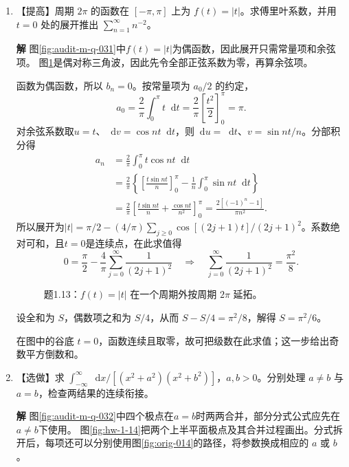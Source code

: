 \documentclass[11pt,openany,fontset=fandol]{ctexbook}
\theoremstyle{plain}\newtheorem{theorem}{定理}[chapter]\newtheorem{proposition}[theorem]{命题}
\theoremstyle{definition}\newtheorem{definition}{定义}[chapter]\newtheorem{example}{例}[chapter]
\theoremstyle{remark}\newtheorem*{remark}{说明}
\newcommand{\SolutionStart}{\par\nobreak\medskip\nobreak\noindent\textbf{解}\quad\ignorespaces}
\newenvironment{solution}{\SolutionStart}{\par\medskip}
\newcommand{\dd}{\mathop{}\!\mathrm d}\newcommand{\ii}{\mathrm i}\newcommand{\ee}{\mathrm e}
\begin{document}
\begin{enumerate}[label=1.\arabic*]
\item \begin{minipage}[t]{\linewidth}
【提高】周期 $2\pi$ 的函数在 $[-\pi,\pi]$ 上为 $f(t)=|t|$。求傅里叶系数，并用 $t=0$ 处的展开推出 $\sum_{n=1}^{\infty}n^{-2}$。

\end{minipage}

\begin{solution}
图\ref{fig:audit-m-q-031}中$f(t)=|t|$为偶函数，因此展开只需常量项和余弦项。
图\ref{fig:ex-1-13}是偶对称三角波，因此先令全部正弦系数为零，再算余弦项。

函数为偶函数，所以 $b_n=0$。按常量项为 $a_0/2$ 的约定，
\[
a_0=\frac2\pi\int_0^\pi t\dd t
=\frac2\pi\left[\frac{t^2}{2}\right]_0^\pi=\pi.
\]
对余弦系数取$u=t$、$\dd v=\cos nt\dd t$，则$\dd u=\dd t$、$v=\sin nt/n$。分部积分得
\begin{align*}
a_n&=\frac2\pi\int_0^\pi t\cos nt\dd t\\
&=\frac2\pi\left\{\left[\frac{t\sin nt}{n}\right]_0^\pi
-\frac1n\int_0^\pi\sin nt\dd t\right\}\\
&=\frac2\pi\left[\frac{t\sin nt}{n}+\frac{\cos nt}{n^2}\right]_0^\pi
=\frac{2[(-1)^n-1]}{\pi n^2}.
\end{align*}
所以展开为$|t|=\pi/2-(4/\pi)\sum_{j\ge0}\cos[(2j+1)t]/(2j+1)^2$。系数绝对可和，且$t=0$是连续点，在此求值得
\[0=\frac\pi2-\frac4\pi\sum_{j=0}^{\infty}\frac1{(2j+1)^2}
\quad\Longrightarrow\quad
\sum_{j=0}^{\infty}\frac1{(2j+1)^2}=\frac{\pi^2}{8}.\]

\begin{figure}[H]\centering
{}
\caption{题1.13：$f(t)=|t|$ 在一个周期外按周期 $2\pi$ 延拓。}\label{fig:ex-1-13}
\end{figure}

设全和为 $S$，偶数项之和为 $S/4$，从而 $S-S/4=\pi^2/8$，解得 $S=\pi^2/6$。

在图中的谷底 $t=0$，函数连续且取零，故可把级数在此求值；这一步给出奇数平方倒数和。
\end{solution}

\item \begin{minipage}[t]{\linewidth}
【选做】求 $\int_{-\infty}^{\infty}\dd x/[(x^2+a^2)(x^2+b^2)]$，$a,b>0$。分别处理 $a\ne b$ 与 $a=b$，检查两结果的连续衔接。
\end{minipage}

\begin{solution}
图\ref{fig:audit-m-q-032}中四个极点在$a=b$时两两合并，部分分式公式应先在$a\ne b$下使用。
图\ref{fig:hw-1-14}把两个上半平面极点及其合并过程画出。分式拆开后，每项还可以分别使用图\ref{fig:orig-014}的路径，将参数换成相应的 $a$ 或 $b$。


\end{solution}
\end{enumerate}
\end{document}
